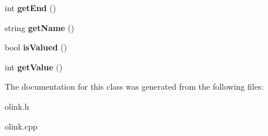 \begin{DoxyCompactItemize}
\item 
\hypertarget{classOlink_a8b58ed6af95b7456263163f4e4517bb9}{int {\bfseries get\-End} ()}\label{classOlink_a8b58ed6af95b7456263163f4e4517bb9}

\item 
\hypertarget{classOlink_ae760f1b6c52a088aab271c218a46eca2}{string {\bfseries get\-Name} ()}\label{classOlink_ae760f1b6c52a088aab271c218a46eca2}

\item 
\hypertarget{classOlink_a5b02ab0f773feaac7a6122d6ed4b0643}{bool {\bfseries is\-Valued} ()}\label{classOlink_a5b02ab0f773feaac7a6122d6ed4b0643}

\item 
\hypertarget{classOlink_a0fe86a082c996b003da3612082d24fab}{int {\bfseries get\-Value} ()}\label{classOlink_a0fe86a082c996b003da3612082d24fab}

\end{DoxyCompactItemize}


\-The documentation for this class was generated from the following files\-:\begin{DoxyCompactItemize}
\item 
olink.\-h\item 
olink.\-cpp\end{DoxyCompactItemize}
